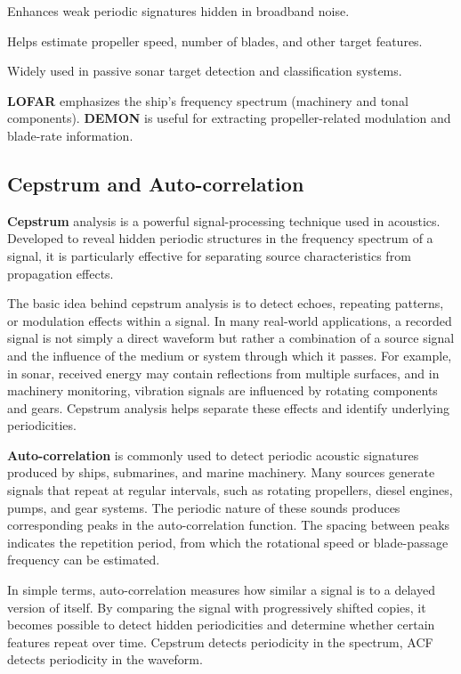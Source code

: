 \begin{compactitem}
    \item Enhances weak periodic signatures hidden in broadband noise.
    \item Helps estimate propeller speed, number of blades, and other target features.
    \item Widely used in passive sonar target detection and classification systems.
\end{compactitem}

\begin{learnpoint}
   \textbf{LOFAR} emphasizes the ship's frequency spectrum (machinery and tonal components). \textbf{DEMON} is useful for extracting propeller-related modulation and blade-rate information. 
\end{learnpoint}

\subsection{Cepstrum and Auto-correlation}

\textbf{Cepstrum} analysis is a powerful signal-processing technique used in acoustics. Developed to reveal hidden periodic structures in the frequency spectrum of a signal, it is particularly effective for separating source characteristics from propagation effects.

The basic idea behind cepstrum analysis is to detect echoes, repeating patterns, or modulation effects within a signal. In many real-world applications, a recorded signal is not simply a direct waveform but rather a combination of a source signal and the influence of the medium or system through which it passes. For example, in sonar, received energy may contain reflections from multiple surfaces, and in machinery monitoring, vibration signals are influenced by rotating components and gears. Cepstrum analysis helps separate these effects and identify underlying periodicities.

\textbf{Auto-correlation} is commonly used to detect periodic acoustic signatures produced by ships, submarines, and marine machinery. Many sources generate signals that repeat at regular intervals, such as rotating propellers, diesel engines, pumps, and gear systems. The periodic nature of these sounds produces corresponding peaks in the auto-correlation function. The spacing between peaks indicates the repetition period, from which the rotational speed or blade-passage frequency can be estimated.

In simple terms, auto-correlation measures how similar a signal is to a delayed version of itself. By comparing the signal with progressively shifted copies, it becomes possible to detect hidden periodicities and determine whether certain features repeat over time. Cepstrum detects periodicity in the spectrum, ACF detects periodicity in the waveform.

